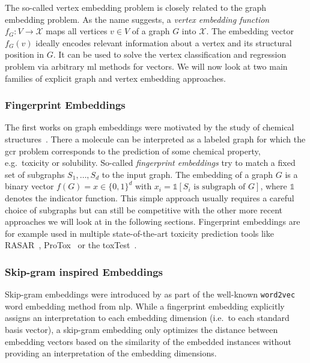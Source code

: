 The so-called vertex embedding problem is closely related to the graph embedding problem.
As the name suggests, a \textit{vertex embedding function} $f_G: V \to \mathcal{X}$ maps all vertices $v \in V$ of a graph $G$ into $\mathcal{X}$.
The embedding vector $f_G(v)$ ideally encodes relevant information about a vertex and its structural position in $G$.
It can be used to solve the vertex classification and regression problem via arbitrary \ac{ml} methods for vectors.
We will now look at two main families of explicit graph and vertex embedding approaches.

\subsubsection{Fingerprint Embeddings}

The first works on graph embeddings were motivated by the study of chemical structures~\cite{Adamson1973}\cite{Willett1986}.
There a molecule can be interpreted as a labeled graph for which the \ac{gcr} problem corresponds to the prediction of some chemical property, e.g.\ toxicity or solubility.
So-called \textit{fingerprint embeddings} try to match a fixed set of subgraphs $S_1, \dots, S_d$ to the input graph.
The embedding of a graph $G$ is a binary vector $f(G) = x \in {\{0, 1\}}^d$ with $x_i = \mathds{1}[\text{$S_i$ is subgraph of $G$}]$, where $\mathds{1}$ denotes the indicator function.
This simple approach usually requires a careful choice of subgraphs but can still be competitive with the other more recent approaches we will look at in the following sections.
Fingerprint embeddings are for example used in multiple state-of-the-art toxicity prediction tools like RASAR~\cite{Luechtefeld2018}\cite{ToxTrack}, ProTox~\cite{Drwal2014}\cite{Banerjee2018}\cite{ProTox} or the \ac{toxTest}~\cite{TEST}.

\subsubsection{Skip-gram inspired Embeddings}

Skip-gram embeddings were introduced by \citeauthor{Mikolov2013} as part of the well-known \texttt{word2vec}~\cite{Mikolov2013} word embedding method from \ac{nlp}.
While a fingerprint embedding explicitly assigns an interpretation to each embedding dimension (i.e.\ to each standard basis vector), a skip-gram embedding only optimizes the distance between embedding vectors based on the similarity of the embedded instances without providing an interpretation of the embedding dimensions.

